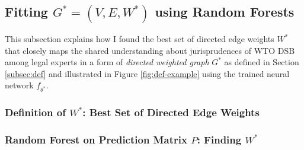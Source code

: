 \documentclass[12pt,letterpaper]{article}
\begin{document}



\subsection{Fitting $G^* = (V, E, W^*)$ using Random Forests}
This subsection explains how I found the best set of directed edge weights $W^*$ that closely maps the shared understanding about jurisprudences of WTO DSB among legal experts in a form of \textit{directed weighted graph} $G^*$ as defined in Section \ref{subsec:def} and illustrated in Figure \ref{fig:def-example} using the trained neural network $f_{\theta^*}$.

\subsubsection{Definition of $W^*$: Best Set of Directed Edge Weights} %

\subsubsection{Random Forest on Prediction Matrix $P$: Finding $W^*$}\label{subsec:rf}


\end{document}
